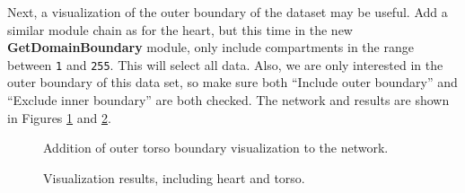 \documentclass[fleqn,11pt,openany]{book}
\begin{document}
Next, a visualization of the outer boundary of the dataset may be
useful. Add a similar module chain as for the heart, but this time in
the new {\bf GetDomainBoundary} module, only include compartments in
the range between {\tt 1} and {\tt 255}. This will select all
data. Also, we are only interested in the outer boundary of this data
set, so make sure both ``Include outer boundary'' and ``Exclude inner
boundary'' are both checked. The network and results are shown in
Figures \ref{fig:p_e_network_3} and \ref{fig:p_e_results_3}.

\begin{figure}
\caption{Addition of outer torso boundary visualization to the
network.}\label{fig:p_e_network_3}
\end{figure}

\begin{figure}
\caption{Visualization results, including heart and
torso.}\label{fig:p_e_results_3}
\end{figure}
\end{document}
